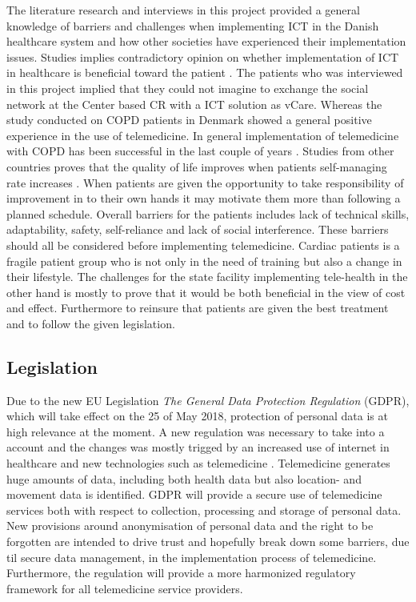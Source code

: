 The literature research and interviews in this project provided a general knowledge of barriers and challenges when implementing ICT in the Danish healthcare system and how other societies have experienced their implementation issues. 
Studies implies contradictory opinion on whether implementation of ICT in healthcare is beneficial toward the patient \cite{considerations, ICT, countries}. The patients who was interviewed in this project implied that they could not imagine to exchange the social network at the Center based CR with a ICT solution as vCare. Whereas the study conducted on COPD patients in Denmark showed a general positive experience in the use of telemedicine. In general implementation of telemedicine with COPD has been successful in the last couple of years \cite{FUT2}. Studies  from other countries proves that the quality of life improves when patients self-managing rate increases \cite{considerations}. When patients are given the opportunity to take responsibility of improvement in to their own hands it may motivate them more than following a planned schedule. 
Overall barriers for the patients includes lack of technical skills, adaptability, safety, self-reliance and lack of social interference. These barriers should all be considered before implementing telemedicine. Cardiac patients is a fragile patient group who is not only in the need of training but also a change in their lifestyle. 
The challenges for the state facility implementing tele-health in the other hand is mostly to prove that it would be both beneficial in the view of cost and effect. Furthermore to reinsure that patients are given the best treatment and to follow the given legislation.


\subsection{Legislation} 
Due to the new EU Legislation \textit{The General Data Protection Regulation} (GDPR), which will take effect on the 25 of May 2018, protection of personal data is at high relevance at the moment. A new regulation was necessary to take into a account and the changes was mostly trigged by an increased use of internet in healthcare and new technologies such as telemedicine \cite{GDPR}. Telemedicine generates huge amounts of data, including both health data but also location- and movement data is identified. GDPR will provide a secure use of telemedicine services both with respect to collection, processing and storage of personal data. New provisions around anonymisation of personal data and the right to be forgotten are intended to drive trust and hopefully break down some barriers, due til secure data management, in the implementation process of telemedicine. Furthermore, the regulation will provide a more harmonized regulatory framework for all telemedicine service providers.   




